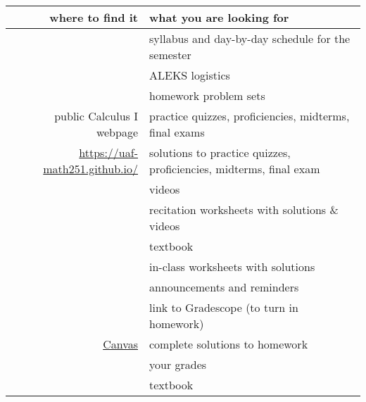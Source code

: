 \documentclass[12pt]{article}
\begin{document}
\begin{table}[h]
\centering
\begin{tabular}{rl}
where to find it&what you are looking for\\
\hline \hline
&syllabus and day-by-day schedule for the semester\\
&ALEKS logistics\\
&homework problem sets\\
public Calculus I webpage&practice quizzes, proficiencies, midterms, final exams\\
\href{https://uaf-math251.github.io/}{https://uaf-math251.github.io/}&solutions to practice quizzes, proficiencies, midterms, final exam\\
&videos\\
&recitation worksheets with solutions \& videos\\
&textbook\\
&in-class worksheets with solutions\\
\hline
&announcements and reminders\\
&link to Gradescope (to turn in homework)\\
\href{https://www.uaf.edu/uaf/current/canvas.php}{Canvas}& complete solutions to homework\\
& your grades\\
&textbook\\
\end{tabular}
\caption{}
\label{wheretofind}
\end{table}
\end{document}
